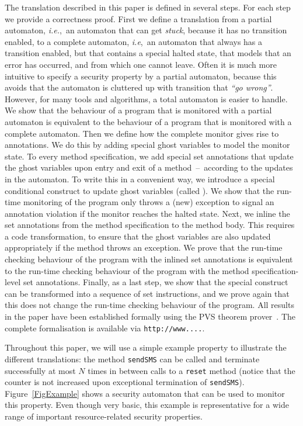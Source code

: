 The translation described in this paper is defined in several
steps. For each step we provide a correctness proof.
First we define a translation from a partial automaton,
\emph{i.e.},\ an automaton that can get \emph{stuck}, because it has
no transition enabled, to a complete automaton, \emph{i.e},\ an
automaton that always has a transition enabled, but that contains a
special \textsf{halted} state, that models that an error has occurred,
and from which one cannot leave. Often it is much more intuitive to
specify a security property by a partial automaton, because this
avoids that the automaton is cluttered up with transition that
\emph{``go wrong''}. However, for many tools and algorithms, a total
automaton is easier to handle. We show that the behaviour of a program
that is monitored with a partial automaton is equivalent to the
behaviour of a program that is monitored with a complete
automaton. Then we define how the complete monitor gives rise to
annotations. We do this by adding special ghost variables to model the
monitor state. To every method specification, we add special
\textsf{set} annotations that update the ghost variables upon entry
and exit of a method~--~according to the updates in the automaton. To
write  this in a convenient way, we introduce a special
conditional construct to update ghost variables (called
\CaseJML). We show that the run-time monitoring of the program
only throws a (new) exception to signal an annotation violation if the
monitor reaches the \textsf{halted} state. Next, we inline the
\textsf{set} annotations from the method specification to the method
body. This requires a code transformation, to ensure that the ghost
variables are also updated appropriately if the method throws an
exception. We prove that the run-time checking behaviour of the
program with the inlined \textsf{set} annotations is equivalent to the
run-time checking behaviour of the program with the method
specification-level \textsf{set} annotations. Finally, as a last step,
we show that the special \CaseJML construct can be transformed
into a sequence of set instructions, and we prove again that this does
not change the run-time checking behaviour of the program. All results
in the paper have been established formally using the PVS theorem
prover~\cite{OwreRRSS96}. The complete formalisation is available via
\texttt{http://www....}.

Throughout this paper, we will use a simple example property to
illustrate the different translations: the method \texttt{sendSMS} can
be called and terminate successfully at most \(N\) times in between
calls to a \texttt{reset} method (notice that the counter is not
increased upon exceptional termination of
\texttt{sendSMS}). Figure~\ref{FigExample} shows a security automaton
that can be used to monitor this property. Even though very basic,
this example is representative for a wide range of important
resource-related security properties.

